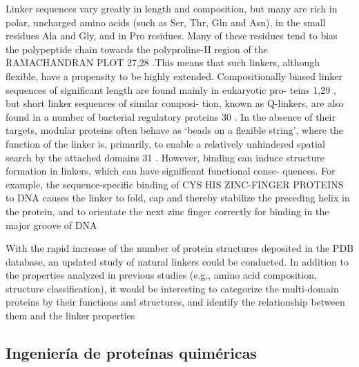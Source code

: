 Linker
sequences vary greatly in length and composition, but
many are rich in polar, uncharged amino acids (such as
Ser, Thr, Gln and Asn), in the small residues Ala and Gly,
and in Pro residues. Many of these residues tend to bias
the polypeptide chain towards the polyproline-II region
of the RAMACHANDRAN PLOT 27,28 .This means that such
linkers, although flexible, have a propensity to be highly
extended. Compositionally biased linker sequences of
significant length are found mainly in eukaryotic pro-
teins 1,29 , but short linker sequences of similar composi-
tion, known as Q-linkers, are also found in a number of
bacterial regulatory proteins 30 .
In the absence of their targets, modular proteins
often behave as ‘beads on a flexible string’, where the
function of the linker is, primarily, to enable a relatively
unhindered spatial search by the attached domains 31 .
However, binding can induce structure formation in
linkers, which can have significant functional conse-
quences. For example, the sequence-specific binding of
CYS HIS ZINC-FINGER PROTEINS to DNA causes the linker to
fold, cap and thereby stabilize the preceding helix in the
protein, and to orientate the next zinc finger correctly
for binding in the major groove of DNA


















With the rapid increase of the number of protein structures deposited in the PDB database, an updated study of natural linkers could be conducted. 
In addition to the properties analyzed in previous studies (e.g., amino acid composition, structure classification), 
it would be interesting to categorize the multi-domain proteins by their functions and structures, and identify the relationship between them and the linker properties










\subsection{Ingeniería de proteínas quiméricas}



